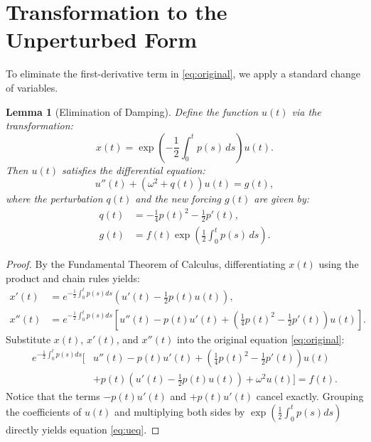 \documentclass[10pt,reqno]{amsart}
\newtheorem{lemma}[theorem]{Lemma}
\theoremstyle{definition}
\begin{document}
	
	\section{Transformation to the Unperturbed Form}
	
	To eliminate the first-derivative term in \eqref{eq:original}, we apply a standard change of variables.
	
	\begin{lemma}[Elimination of Damping]
		Define the function $u(t)$ via the transformation:
		\begin{equation} \label{eq:transform}
			x(t) = \exp\left(-\frac{1}{2}\int_0^t p(s) \, ds\right) u(t).
		\end{equation}
		Then $u(t)$ satisfies the differential equation:
		\begin{equation} \label{eq:ueq}
			u''(t) + (\omega^2 + q(t))u(t) = g(t),
		\end{equation}
		where the perturbation $q(t)$ and the new forcing $g(t)$ are given by:
		\begin{align}
			q(t) &= -\frac{1}{4}p(t)^2 - \frac{1}{2}p'(t), \\
			g(t) &= f(t)\exp\left(\frac{1}{2}\int_0^t p(s) \, ds\right).
		\end{align}
	\end{lemma}
	
	\begin{proof}
		By the Fundamental Theorem of Calculus, differentiating $x(t)$ using the product and chain rules yields:
		\begin{align*}
			x'(t) &= e^{-\frac{1}{2}\int_0^t p(s)ds} \left( u'(t) - \frac{1}{2}p(t)u(t) \right), \\
			x''(t) &= e^{-\frac{1}{2}\int_0^t p(s)ds} \left[ u''(t) - p(t)u'(t) + \left(\frac{1}{4}p(t)^2 - \frac{1}{2}p'(t)\right)u(t) \right].
		\end{align*}
		Substitute $x(t)$, $x'(t)$, and $x''(t)$ into the original equation \eqref{eq:original}:
		\begin{align*}
			e^{-\frac{1}{2}\int_0^t p(s)ds} \Bigg[ &u''(t) - p(t)u'(t) + \left(\frac{1}{4}p(t)^2 - \frac{1}{2}p'(t)\right)u(t) \\
			&+ p(t)\left(u'(t) - \frac{1}{2}p(t)u(t)\right) + \omega^2 u(t) \Bigg] = f(t).
		\end{align*}
		Notice that the terms $-p(t)u'(t)$ and $+p(t)u'(t)$ cancel exactly. Grouping the coefficients of $u(t)$ and multiplying both sides by $\exp(\frac{1}{2}\int_0^t p(s)ds)$ directly yields equation \eqref{eq:ueq}.
	\end{proof}
	
\end{document}
